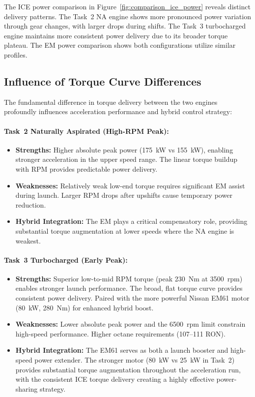 The ICE power comparison in Figure~\ref{fig:comparison_ice_power} reveals distinct delivery patterns. The Task~2 NA engine shows more pronounced power variation through gear changes, with larger drops during shifts. The Task~3 turbocharged engine maintains more consistent power delivery due to its broader torque plateau. The EM power comparison shows both configurations utilize similar profiles.


\subsection{Influence of Torque Curve Differences}

The fundamental difference in torque delivery between the two engines profoundly influences acceleration performance and hybrid control strategy:

\paragraph{Task~2 Naturally Aspirated (High-RPM Peak):}
\begin{itemize}
    \item \textbf{Strengths:} Higher absolute peak power (175~kW vs 155~kW), enabling stronger acceleration in the upper speed range. The linear torque buildup with RPM provides predictable power delivery.
    
    \item \textbf{Weaknesses:} Relatively weak low-end torque requires significant EM assist during launch. Larger RPM drops after upshifts cause temporary power reduction.
    
    \item \textbf{Hybrid Integration:} The EM plays a critical compensatory role, providing substantial torque augmentation at lower speeds where the NA engine is weakest.
\end{itemize}

\paragraph{Task~3 Turbocharged (Early Peak):}
\begin{itemize}
    \item \textbf{Strengths:} Superior low-to-mid RPM torque (peak 230~Nm at 3500~rpm) enables stronger launch performance. The broad, flat torque curve provides consistent power delivery. Paired with the more powerful Nissan EM61 motor (80~kW, 280~Nm) for enhanced hybrid boost.
    
    \item \textbf{Weaknesses:} Lower absolute peak power and the 6500~rpm limit constrain high-speed performance. Higher octane requirements (107--111 RON).
    
    \item \textbf{Hybrid Integration:} The EM61 serves as both a launch booster and high-speed power extender. The stronger motor (80~kW vs 25~kW in Task~2) provides substantial torque augmentation throughout the acceleration run, with the consistent ICE torque delivery creating a highly effective power-sharing strategy.
\end{itemize}

